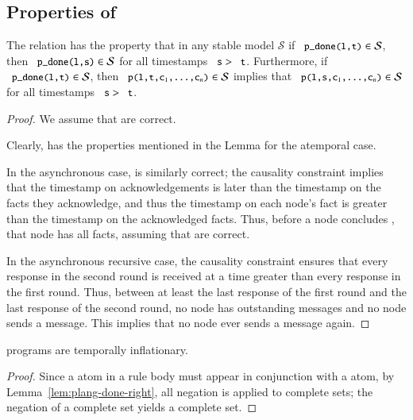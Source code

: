 \subsection{Properties of \plang}
\begin{lemma}[Sealing]
\label{lem:plang-done-right}
The relation  has the property that in any stable model $\mathcal{S}$ if $\dedalus{p_done(l,t)} \in \mathcal{S}$,  then $\dedalus{p_done(l,s)} \in \mathcal{S}$ for all timestamps $\dedalus{s} > \dedalus{t}$.  Furthermore, if $\dedalus{p_done(l,t)} \in \mathcal{S}$, then $\dedalus{p(l,t,c\sub{1},\ldots,c\sub{n})} \in \mathcal{S}$ implies that $\dedalus{p(l,s,c\sub{1},\ldots,c\sub{n})} \in \mathcal{S}$ for all timestamps $\dedalus{s} > \dedalus{t}$.
\end{lemma}
\begin{proof}
We assume that  are correct.

Clearly,  has the properties mentioned in the Lemma for the atemporal case.

In the asynchronous case,  is similarly correct; the causality constraint implies that the timestamp on acknowledgements is later than the timestamp on the facts they acknowledge, and thus the timestamp on each node's  fact is greater than the timestamp on the acknowledged facts.  Thus, before a node concludes , that node has all facts, assuming that  are correct.

In the asynchronous recursive case, the causality constraint ensures that every response in the second round is received at a time greater than every response in the first round.  Thus, between at least the last response of the first round and the last response of the second round, no node has outstanding messages and no node sends a message.  This implies that no node ever sends a message again.
\end{proof}

\begin{lemma}
\label{lem:plang-inflationary}
\plang programs are temporally inflationary.
\end{lemma}
\begin{proof}
Since a  atom in a rule body must appear in conjunction with a  atom, by Lemma~\ref{lem:plang-done-right}, all negation is applied to complete sets; the negation of a complete set yields a complete set.
\end{proof}

